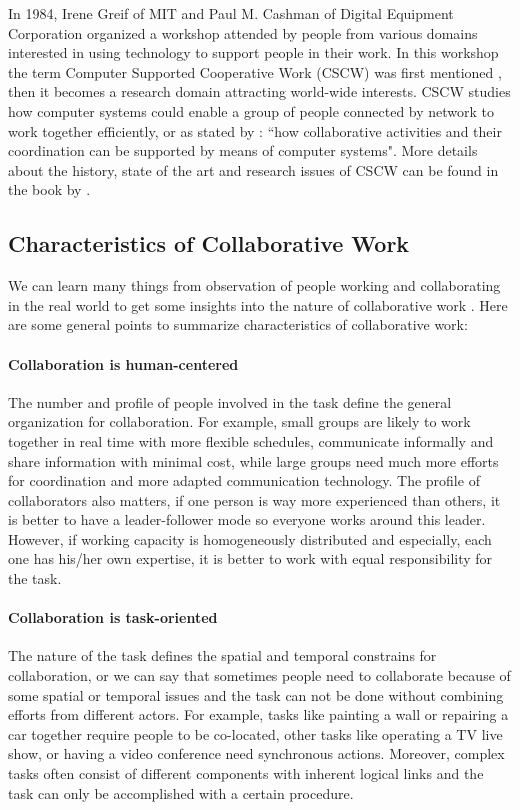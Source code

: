 In 1984, Irene Greif of MIT and Paul M. Cashman of Digital Equipment Corporation organized a workshop attended by people from various domains interested in using technology to support people in their work. In this workshop the term Computer Supported Cooperative Work (CSCW) was first mentioned \citep{Grudin1994Computer}, then it becomes a research domain attracting world-wide interests. CSCW studies how computer systems could enable a group of people connected by network to work together efficiently, or as stated by \citet{Carstensen1999CSCW}: ``how collaborative activities and their coordination can be supported by means of computer systems". More details about the history, state of the art and research issues of CSCW can be found in the book by \citet{Beaudouin1999CSCW}.


\subsection{Characteristics of Collaborative Work}
We can learn many things from observation of people working and collaborating in the real world to get some insights into the nature of collaborative work \citep{Churchill1998CVE}. Here are some general points to summarize characteristics of collaborative work:

\paragraph{Collaboration is human-centered} The number and profile of people involved in the task define the general organization for collaboration. For example, small groups are likely to work together in real time with more flexible schedules, communicate informally and share information with minimal cost, while large groups need much more efforts for coordination and more adapted communication technology. The profile of collaborators also matters, if one person is way more experienced than others, it is better to have a leader-follower mode so everyone works around this leader. However, if working capacity is homogeneously distributed and especially, each one has his/her own expertise, it is better to work with equal responsibility for the task.

\paragraph{Collaboration is task-oriented} The nature of the task defines the spatial and temporal constrains for collaboration, or we can say that sometimes people need to collaborate because of some spatial or temporal issues and the task can not be done without combining efforts from different actors. For example, tasks like painting a wall or repairing a car together require people to be co-located, other tasks like operating a TV live show, or having a video conference need synchronous actions. Moreover, complex tasks often consist of different components with inherent logical links and the task can only be accomplished with a certain procedure.

